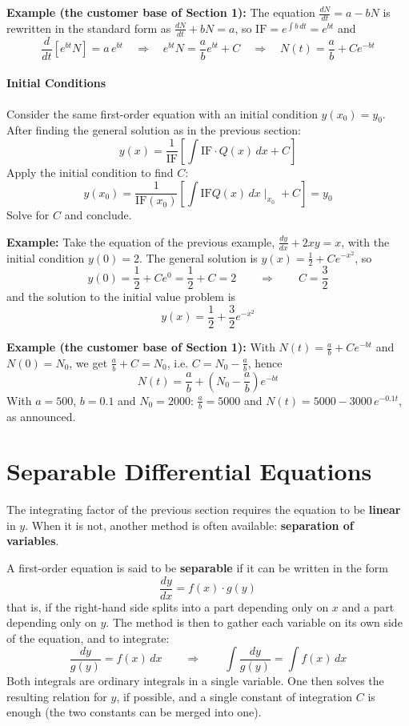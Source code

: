 \documentclass[]{article}
\begin{document}
	\noindent \textbf{Example (the customer base of Section 1):}
	The equation $\frac{dN}{dt} = a - bN$ is rewritten in the standard form as $\frac{dN}{dt} + bN = a$, so $\text{IF} = e^{\int b \, dt} = e^{bt}$ and
	$$
	\frac{d}{dt}\left[e^{bt} N\right] = a \, e^{bt}
	\quad \Longrightarrow \quad
	e^{bt} N = \frac{a}{b} e^{bt} + C
	\quad \Longrightarrow \quad
	N(t) = \frac{a}{b} + C e^{-bt}
	$$

	\paragraph{Initial Conditions}
	
	Consider the same first-order equation with an initial condition $y(x_0) = y_0$.
	After finding the general solution as in the previous section:
	$$
	y(x) = \frac{1}{\text{IF}}\left[\int \text{IF} \cdot Q(x) \, dx + C\right]
	$$
	Apply the initial condition to find $C$:
	$$
	y(x_0) = \frac{1}{\text{IF}(x_0)}\left[\int \text{IF}Q(x) \, dx \mid_{x_0} + C\right] = y_0
	$$
	Solve for $C$ and conclude.

	\noindent \textbf{Example:}
	Take the equation of the previous example, $\frac{dy}{dx} + 2xy = x$, with the initial condition $y(0) = 2$.
	The general solution is $y(x) = \frac{1}{2} + C e^{-x^2}$, so
	$$
	y(0) = \frac{1}{2} + C e^{0} = \frac{1}{2} + C = 2
	\qquad \Longrightarrow \qquad
	C = \frac{3}{2}
	$$
	and the solution to the initial value problem is
	$$
	y(x) = \frac{1}{2} + \frac{3}{2} e^{-x^2}
	$$

	\noindent \textbf{Example (the customer base of Section 1):}
	With $N(t) = \frac{a}{b} + Ce^{-bt}$ and $N(0) = N_0$, we get $\frac{a}{b} + C = N_0$, i.e. $C = N_0 - \frac{a}{b}$, hence
	$$
	N(t) = \frac{a}{b} + \left(N_0 - \frac{a}{b}\right) e^{-bt}
	$$
	With $a = 500$, $b = 0.1$ and $N_0 = 2000$: $\frac{a}{b} = 5000$ and $N(t) = 5000 - 3000\, e^{-0.1t}$, as announced.

	\section{Separable Differential Equations}

	The integrating factor of the previous section requires the equation to be \textbf{linear} in $y$.
	When it is not, another method is often available: \textbf{separation of variables}.

	A first-order equation is said to be \textbf{separable} if it can be written in the form
	$$
	\frac{dy}{dx} = f(x) \cdot g(y)
	$$
	that is, if the right-hand side splits into a part depending only on $x$ and a part depending only on $y$.
	The method is then to gather each variable on its own side of the equation, and to integrate:
	$$
	\frac{dy}{g(y)} = f(x) \, dx
	\qquad \Longrightarrow \qquad
	\int \frac{dy}{g(y)} = \int f(x) \, dx
	$$
	Both integrals are ordinary integrals in a single variable.
	One then solves the resulting relation for $y$, if possible, and a single constant of integration $C$ is enough (the two constants can be merged into one).
\end{document}
